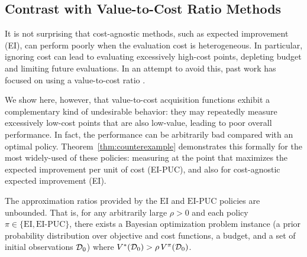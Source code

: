 \subsection{Contrast with Value-to-Cost Ratio Methods}

 It is not surprising that cost-agnostic methods, such as expected improvement (EI), can perform poorly when the evaluation cost is heterogeneous. 
In particular, ignoring cost can lead to evaluating excessively high-cost points, depleting budget and limiting future evaluations. In an attempt to avoid this, past work has focused on using a value-to-cost ratio \citep{Snoek2012ML, swersky2013multi,kandasamy2016gaussian,kandasamy2017multi, poloczek2017multi, song2019general, wu2020practical, lee2020cost}. 

We show here, however, that value-to-cost acquisition functions exhibit a complementary kind of undesirable behavior: they may repeatedly measure excessively low-cost points that are also low-value, leading to poor overall performance. In fact, the performance can be arbitrarily bad compared with an optimal policy. Theorem~\ref{thm:counterexample} demonstrates this formally for the most widely-used of these policies: measuring at the point that maximizes the expected improvement per unit of cost (EI-PUC), and also for cost-agnostic expected improvement (EI).

\begin{theorem}
\label{thm:counterexample}
The approximation ratios provided by the $\mathrm{EI}$ and $\mathrm{EI\text{-}PUC}$ policies are unbounded. That is, for any arbitrarily large $\rho > 0$ and each policy $\pi\in\{\mathrm{EI}, \mathrm{EI\text{-}PUC}\}$, there exists a Bayesian optimization problem instance (a  prior probability distribution over objective and cost functions, a budget, and a set of initial observations $\mathcal{D}_0$) where 
$V^*(\mathcal{D}_0) > \rho \, V^{\pi}(\mathcal{D}_0)$.
\end{theorem}


